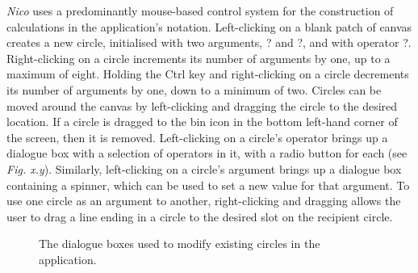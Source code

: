 \documentclass[12pt,twoside,notitlepage,xetex]{report}
\begin{document}
\emph{Nico} uses a predominantly mouse-based control system for the
construction of calculations in the application's notation.  Left-clicking on a
blank patch of canvas creates a new circle, initialised with two arguments,
{\sfapp ?} and {\sfapp ?}, and with operator {\sfapp ?}.  Right-clicking on a
circle increments its number of arguments by one, up to a maximum of eight.
Holding the Ctrl key and right-clicking on a circle decrements its number of
arguments by one, down to a minimum of two.  Circles can be moved around the
canvas by left-clicking and dragging the circle to the desired location.  If a
circle is dragged to the bin icon in the bottom left-hand corner of the screen,
then it is removed.  Left-clicking on a circle's operator brings up a dialogue
box with a selection of operators in it, with a radio button for each (see
\emph{Fig. x.y}).  Similarly, left-clicking on a circle's argument brings up a
dialogue box containing a spinner, which can be used to set a new value for
that argument.  To use one circle as an argument to another, right-clicking and
dragging allows the user to drag a line ending in a circle to the desired slot
on the recipient circle.

\begin{center}
\begin{figure}[H]
\begin{center}
\end{center}
\caption{The dialogue boxes used to modify existing circles in the application.}
\end{figure}
\end{center}
\end{document}

